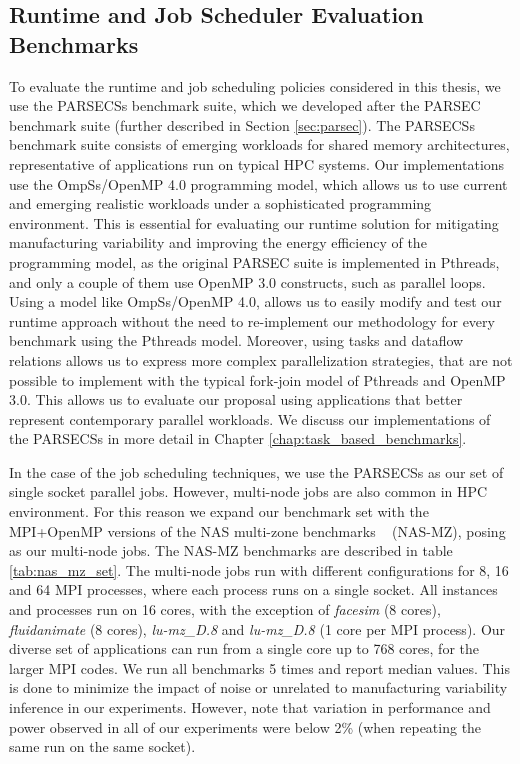 \subsection{Runtime and Job Scheduler Evaluation Benchmarks}
\label{sec:benchmarks}
To evaluate the runtime and job scheduling policies considered in this thesis, we use the
 PARSECSs benchmark suite, which we developed after the PARSEC benchmark suite (further
described in Section \ref{sec:parsec}).  The PARSECSs benchmark suite consists of emerging
workloads for shared memory architectures, representative of applications run on typical
HPC systems.  Our implementations use the OmpSs/OpenMP 4.0 programming model, which allows
us to use current and emerging realistic workloads under a sophisticated programming
environment.  This is essential for evaluating our runtime solution for mitigating
manufacturing variability and improving the energy efficiency of the programming model, as the
original PARSEC suite is implemented in Pthreads, and only a couple of them use OpenMP 3.0
constructs, such as parallel loops.  Using a model like OmpSs/OpenMP 4.0, allows us to
easily modify and test our runtime approach without the need to re-implement our methodology for every
benchmark using the Pthreads model.  Moreover, using tasks and dataflow relations allows
us to express more complex parallelization strategies, that are not possible to implement
with the typical fork-join model of Pthreads and OpenMP 3.0.  This allows us to evaluate
our proposal using applications that better represent contemporary parallel workloads.
We discuss our implementations of the PARSECSs in more detail in Chapter
\ref{chap:task_based_benchmarks}.  

In the case of the job scheduling techniques, we use the PARSECSs
as our set of single socket parallel jobs.  However,  multi-node jobs are also common in HPC
environment.  For this reason we expand our benchmark set with the
MPI+OpenMP versions of the NAS multi-zone benchmarks ~\cite{Jin:2006:PCM:1143496.1143503} (NAS-MZ), posing
as our multi-node jobs.  The NAS-MZ benchmarks are described in table \ref{tab:nas_mz_set}. 
The multi-node jobs
run with different configurations for 8, 16 and 64 MPI processes, where each process runs
on a single socket.  All instances and processes run on 16 cores, with the exception of
\textit{facesim} (8 cores), \textit{fluidanimate} (8 cores), \textit{lu-mz\_D.8} and
\textit{lu-mz\_D.8} (1 core per MPI process).  Our diverse set of applications can run
from a single core up to 768 cores, for the larger MPI codes.  We run all benchmarks 5
times and report median values.  This is done to minimize the impact of noise or unrelated
to manufacturing variability inference in our experiments.  However, note that variation
in performance and power observed in all of our experiments were below 2\% (when repeating 
the same run on the same socket).

